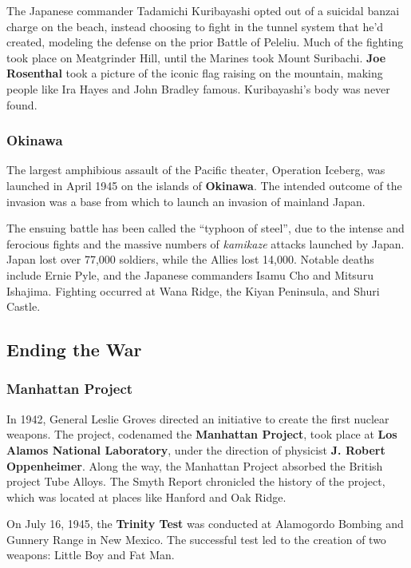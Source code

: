 The Japanese commander Tadamichi Kuribayashi opted out of a suicidal banzai charge on the beach,
instead choosing to fight in the tunnel system that he'd created,
modeling the defense on the prior Battle of Peleliu.
Much of the fighting took place on Meatgrinder Hill,
until the Marines took Mount Suribachi.
\textbf{Joe Rosenthal} took a picture of the iconic flag raising on the mountain,
making people like Ira Hayes and John Bradley famous.
Kuribayashi's body was never found.

\subsubsection*{Okinawa}

The largest amphibious assault of the Pacific theater, Operation Iceberg,
was launched in April 1945 on the islands of \textbf{Okinawa}.
The intended outcome of the invasion was a base from which to launch an invasion of mainland Japan.

The ensuing battle has been called the ``typhoon of steel'',
due to the intense and ferocious fights and the massive numbers of \textit{kamikaze} attacks launched by Japan.
Japan lost over 77,000 soldiers, while the Allies lost 14,000.
Notable deaths include Ernie Pyle, and the Japanese commanders Isamu Cho and Mitsuru Ishajima.
Fighting occurred at Wana Ridge, the Kiyan Peninsula, and Shuri Castle.

\subsection*{Ending the War}

\subsubsection*{Manhattan Project}

In 1942, General Leslie Groves directed an initiative to create the first nuclear weapons.
The project, codenamed the \textbf{Manhattan Project}, took place at \textbf{Los Alamos National Laboratory},
under the direction of physicist \textbf{J. Robert Oppenheimer}.
Along the way, the Manhattan Project absorbed the British project Tube Alloys.
The Smyth Report chronicled the history of the project, which was located at places like Hanford and Oak Ridge.

On July 16, 1945, the \textbf{Trinity Test} was conducted at Alamogordo Bombing and Gunnery Range in New Mexico.
The successful test led to the creation of two weapons: Little Boy and Fat Man.

